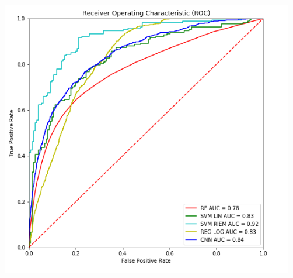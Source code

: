 \documentclass[a4paper,11pt]{report}
\begin{document}
\begin{center}
  \includegraphics[scale=0.9]{imgs/auc.png}
\end{center}

\newpage



\end{document}
